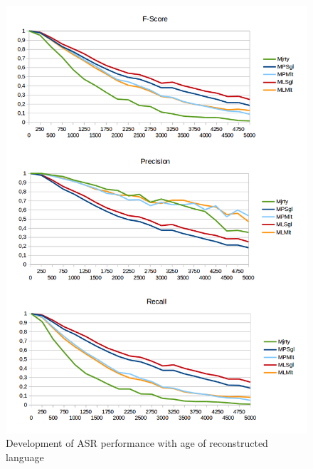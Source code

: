 \begin{figure}
 \includegraphics[width=\textwidth]{figures/recon-eval-timedepth.png}
 \caption{Development of ASR performance with age of reconstructed language}
 \label{asr-results-by-age}
\end{figure}

